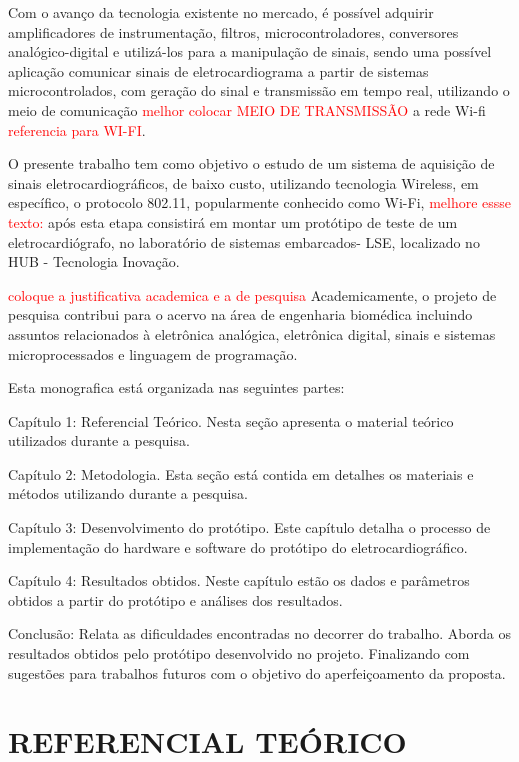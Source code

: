 \documentclass[12pt, a4paper]{article}
\begin{document}
Com o avanço da tecnologia existente no mercado, é possível adquirir amplificadores de instrumentação, filtros, microcontroladores, conversores analógico-digital e utilizá-los para a manipulação de sinais, sendo uma possível aplicação comunicar sinais de eletrocardiograma a partir de sistemas microcontrolados, com geração do sinal e transmissão em tempo real, utilizando o meio de comunicação \textcolor{red}{melhor colocar MEIO DE TRANSMISSÃO} a rede Wi-fi \textcolor{red}{referencia para WI-FI}.
  
	O presente trabalho tem como objetivo o estudo de um sistema de aquisição de sinais eletrocardiográficos, de baixo custo, utilizando tecnologia Wireless, em específico, o protocolo 802.11, popularmente conhecido como Wi-Fi, \textcolor{red}{melhore essse texto:} após esta etapa consistirá em montar um protótipo de teste de um eletrocardiógrafo, no laboratório de sistemas embarcados- LSE, localizado no HUB - Tecnologia Inovação.
    
    \textcolor{red}{coloque a justificativa academica e a de pesquisa} Academicamente, o projeto de pesquisa contribui para o acervo na área de engenharia biomédica incluindo assuntos relacionados à eletrônica analógica, eletrônica digital, sinais e sistemas microprocessados e linguagem de programação.
    
    Esta monografica está organizada nas seguintes partes:
    
    Capítulo 1: Referencial Teórico. Nesta seção apresenta o material teórico utilizados durante a pesquisa.
    
    Capítulo 2: Metodologia. Esta seção está contida em detalhes os materiais e métodos utilizando durante a pesquisa.
    
    Capítulo 3: Desenvolvimento do protótipo. Este capítulo detalha o processo de implementação do hardware e software do protótipo do eletrocardiográfico.
    
    Capítulo 4: Resultados obtidos. Neste capítulo estão os dados e parâmetros obtidos a partir do protótipo e análises dos resultados.
    
   Conclusão: Relata as dificuldades encontradas no decorrer do trabalho. Aborda os resultados obtidos pelo protótipo desenvolvido no projeto. Finalizando com sugestões para trabalhos futuros com o objetivo do aperfeiçoamento da proposta.
   
    
    


\newpage
\section{REFERENCIAL TEÓRICO}	
\end{document}
